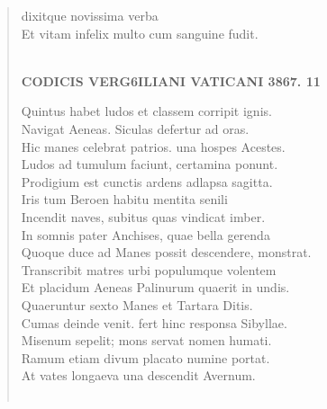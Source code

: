 \documentclass[11pt, a4paper]{report}
\begin{document}
\begin{verse}
dixitque novissima verba \\ Et vitam infelix multo cum sanguine fudit. \\ 
        ﻿\pagebreak 
    \begin{center} \textbf{CODICIS VERG6ILIANI VATICANI 3867. 11} \end{center}Quintus habet ludos et classem corripit ignis. \\ Navigat Aeneas. Siculas defertur ad oras. \\ Hic manes celebrat patrios. una hospes Acestes. \\ Ludos ad tumulum faciunt, certamina ponunt. \\ Prodigium est cunctis ardens adlapsa sagitta. \\ Iris tum Beroen habitu mentita senili \\ Incendit naves, subitus quas vindicat imber. \\ In somnis pater Anchises, quae bella gerenda \\ Quoque duce ad Manes possit descendere, monstrat. \\ Transcribit matres urbi populumque volentem \\ Et placidum Aeneas Palinurum quaerit in undis. \\ Quaeruntur sexto Manes et Tartara Ditis. \\ Cumas deinde venit. fert hinc responsa Sibyllae. \\ Misenum sepelit; mons servat nomen humati. \\ Ramum etiam divum placato numine portat. \\ At vates longaeva una descendit Avernum. \\ 
        ﻿\pagebreak 

\end{verse}
\end{document}
